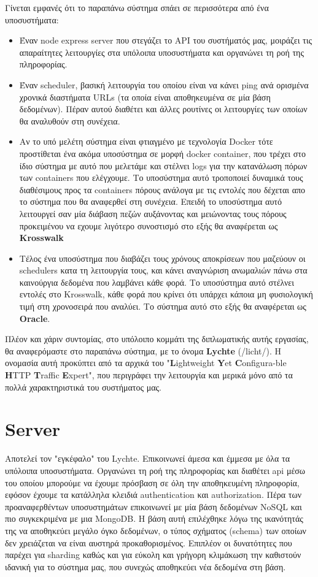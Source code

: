 Γίνεται εμφανές ότι το παραπάνω σύστημα σπάει σε περισσότερα από ένα υποσυστήματα: 

\begin{itemize}
    \item Έναν node express server που στεγάζει το API του συστήματός μας, μοιράζει τις απαραίτητες λειτουργίες στα υπόλοιπα υποσυστήματα και οργανώνει τη ροή της πληροφορίας.
    \item Έναν scheduler, βασική λειτουργία του οποίου είναι να κάνει ping ανά ορισμένα χρονικά διαστήματα URLs (τα οποία είναι αποθηκευμένα σε μία βάση δεδομένων). Πέραν αυτού διαθέτει και άλλες ρουτίνες οι λειτουργίες των οποίων θα αναλυθούν στη συνέχεια.
    \item Αν το υπό μελέτη σύστημα είναι φτιαγμένο με τεχνολογία Docker τότε προστίθεται ένα ακόμα υποσύστημα σε μορφή docker container, που τρέχει στο ίδιο σύστημα με αυτό που μελετάμε και στέλνει logs για την κατανάλωση πόρων των containers που ελέγχουμε. Το υποσύστημα αυτό τροποποιεί δυναμικά τους διαθέσιμους προς τα containers πόρους ανάλογα με τις εντολές που δέχεται απο το σύστημα που θα αναφερθεί στη συνέχεια. Επειδή το υποσύστημα αυτό λειτουργεί σαν μία διάβαση πεζών αυξάνοντας και μειώνοντας τους πόρους προκειμένου να εχουμε λιγότερο συνοστισμό στο εξής θα αναφέρεται ως \textbf{Krosswalk}
    \item Τέλος ένα υποσύστημα που διαβάζει τους χρόνους αποκρίσεων που μαζεύουν οι schedulers κατα τη λειτουργία τους, και κάνει αναγνώριση ανωμαλιών πάνω στα καινούργια δεδομένα που λαμβάνει κάθε φορά. Το υποσύστημα αυτό στέλνει εντολές στο Krosswalk, κάθε φορά που κρίνει ότι υπάρχει κάποια μη φυσιολογική τιμή στη χρονοσειρά που αναλύει. Το σύστημα αυτό στο εξής θα αναφέρεται ως \textbf{Oracle}. 
\end{itemize}

Πλέον και χάριν συντομίας, στο υπόλοιπο κομμάτι της διπλωματικής αυτής εργασίας, θα αναφερόμαστε στο παραπάνω σύστημα, με το όνομα \textbf{Lychte} (/licht/). Η ονομασία αυτή προκύπτει από τα αρχικά του "\textbf{L}ightweight \textbf{Y}et \textbf{C}onfigura\hyp{}ble \textbf{H}ΤTP \textbf{T}raffic \textbf{E}xpert", που περιγράφει την λειτουργία και μερικά μόνο από τα πολλά χαρακτηριστικά του συστήματος μας.

\section{Server}
\label{section:lychte_server}

Αποτελεί τον "εγκέφαλο" του Lychte. Επικοινωνεί άμεσα και έμμεσα με όλα τα υπόλοιπα υποσυστήματα. Οργανώνει τη ροή της πληροφορίας και διαθέτει api μέσω του οποίου μπορούμε να έχουμε πρόσβαση σε όλη την αποθηκευμένη πληροφορία, εφόσον έχουμε τα κατάλληλα κλειδιά authentication και authorization. Πέρα των προαναφερθέντων υποσυστημάτων επικοινωνεί με μία βάση δεδομένων NoSQL και πιο συγκεκριμένα με μια MongoDB.
Η βάση αυτή επιλέχθηκε λόγω της ικανότητάς της να αποθηκεύει μεγάλο όγκο δεδομένων, ο τύπος σχήματος (schema) των οποίων δεν χρειάζεται να είναι αυστηρά προκαθορισμένος. Επιπλέον οι δυνατότητες που παρέχει για sharding καθώς και για εύκολη και γρήγορη κλιμάκωση την καθιστούν ιδανική για το σύστημα μας, που συνεχώς αποθηκεύει νέα δεδομένα στη βάση.

